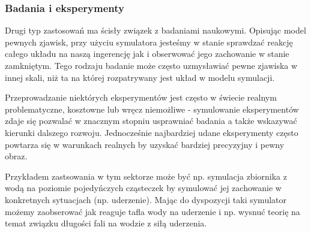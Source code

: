 \subsubsection{Badania i eksperymenty}
\par{
Drugi typ zastosowań ma ścisły związek z badaniami naukowymi.
Opisując model pewnych zjawisk, przy użyciu symulatora jesteśmy w stanie sprawdzać reakcję całego układu na naszą ingerencję jak i obserwować jego zachowanie w stanie zamkniętym. Tego rodzaju badanie może często uzmysławiać pewne zjawiska w innej skali, niż ta na której rozpatrywany jest układ w modelu symulacji.
}
\par{
Przeprowadzanie niektórych eksperymentów jest często w świecie realnym problematyczne, kosztowne lub wręcz niemożliwe - symulowanie eksperymentów zdaje się pozwalać w znacznym stopniu usprawniać badania a także wskazywać kierunki dalszego rozwoju. Jednocześnie najbardziej udane eksperymenty często powtarza się w warunkach realnych by uzyskać bardziej precyzyjny i pewny obraz.
}
\par{
Przykładem zastsowania w tym sektorze może być np. symulacja zbiornika z wodą na poziomie pojedyńczych cząsteczek by symulować jej zachowanie w konkretnych sytuacjach (np. uderzenie). Mając do dyspozycji taki symulator możemy zaobserować jak reaguje tafla wody na uderzenie i np. wysnuć teorię na temat związku długości fali na wodzie z siłą uderzenia.
}

